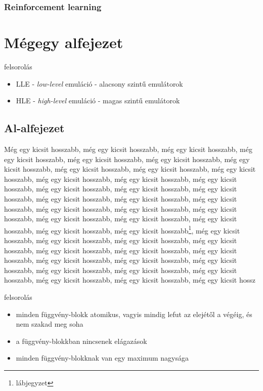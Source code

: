 \documentclass[a4paper,oneside,onecolumn,12pt]{LegrandOrangeBook}
\begin{document}
			\subsubsection{Reinforcement learning}
\section{Mégegy alfejezet}

felsorolás

\begin{itemize}
    \item LLE - {\it low-level} emuláció - alacsony szintű emulátorok %
    \item HLE - {\it high-level} emuláció - magas szintű emulátorok %
\end{itemize}


\subsection{Al-alfejezet}

Még egy kicsit hosszabb, még egy kicsit hosszabb, még egy kicsit hosszabb, még egy kicsit hosszabb, még egy kicsit hosszabb, még egy kicsit hosszabb, még egy kicsit hosszabb, még egy kicsit hosszabb, még egy kicsit hosszabb, még egy kicsit hosszabb, még egy kicsit hosszabb, még egy kicsit hosszabb, még egy kicsit hosszabb, még egy kicsit hosszabb, még egy kicsit hosszabb, még egy kicsit hosszabb, még egy kicsit hosszabb, még egy kicsit hosszabb, még egy kicsit hosszabb, még egy kicsit hosszabb, még egy kicsit hosszabb, még egy kicsit hosszabb, még egy kicsit hosszabb, még egy kicsit hosszabb, még egy kicsit hosszabb, még egy kicsit hosszabb, még egy kicsit hosszabb\footnote{lábjegyzet}, még egy kicsit hosszabb, még egy kicsit hosszabb, még egy kicsit hosszabb, még egy kicsit hosszabb, még egy kicsit hosszabb, még egy kicsit hosszabb, még egy kicsit hosszabb, még egy kicsit hosszabb, még egy kicsit hosszabb, még egy kicsit hosszabb, még egy kicsit hosszabb, még egy kicsit hosszabb, még egy kicsit hosszabb, még egy kicsit hosszabb, még egy kicsit hosszabb, még egy kicsit hossz

felsorolás
\begin{itemize}
    \item minden függvény-blokk atomikus, vagyis mindig lefut az elejétől a végéig, és nem szakad meg soha
    \item a függvény-blokkban nincsenek elágazások
    \item minden függvény-blokknak van egy maximum nagysága
\end{itemize}
\end{document}
